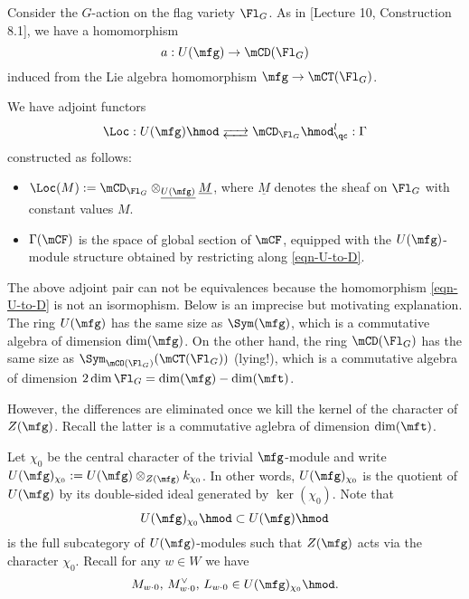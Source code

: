 	Consider the $G$-action on the flag variety $\Fl_G$. As in [Lecture 10, Construction 8.1], we have a homomorphism
	\begin{equation}
		\label{eqn-U-to-D}
		a: U(\mfg) \to \mCD(\Fl_G)
	\end{equation}
	induced from the Lie algebra homomorphism $\mfg \to \mCT(\Fl_G)$.

	\begin{constr}
		We have adjoint functors
		\begin{equation}
			\label{eqn-loc-gamma}
			\Loc: U(\mfg)\hmod \adj \mCD_{\Fl_G}\hmod_\qc^l : \Gamma
		\end{equation}
		constructed as follows:
		\begin{itemize}
			\item 
				$\Loc(M):=  \mCD_{\Fl_G}\ot_{\underline{U(\mfg)}} \underline{M}$, where $\underline{M}$ denotes the sheaf on $\Fl_G$ with constant values $M$.
			\item
				$\Gamma(\mCF)$ is the space of global section of $\mCF$, equipped with the $U(\mfg)$-module structure obtained by restricting along \eqref{eqn-U-to-D}.
		\end{itemize}
	\end{constr}

	\begin{rem}
		The above adjoint pair can not be equivalences because the homomorphism \eqref{eqn-U-to-D} is not an isormophism. Below is an imprecise but motivating explanation. The ring $U(\mfg)$ has the same size as $\Sym(\mfg)$, which is a commutative algebra of dimension $\dim(\mfg)$. On the other hand, the ring $\mCD(\Fl_G)$ has the same size as $\Sym_{\mCO(\Fl_G)}(\mCT(\Fl_G))$ (lying!), which is a commutative algebra of dimension $2\dim \Fl_G = \dim(\mfg)-\dim(\mft)$.
	\end{rem}

	However, the differences are eliminated once we kill the kernel of the character of $Z(\mfg)$. Recall the latter is a commutative aglebra of dimension $\dim(\mft)$.

	\begin{constr}
		Let $\chi_0$ be the central character of the trivial $\mfg$-module and write $U(\mfg)_{\chi_0}:= U(\mfg) \ot_{Z(\mfg)} k_{\chi_0}$. In other words, $U(\mfg)_{\chi_0}$ is the quotient of $U(\mfg)$ by its double-sided ideal generated by $\ker(\chi_0)$. Note that 
		\[
			U(\mfg)_{\chi_0}\hmod  \subset U(\mfg)\hmod
		\]
		is the full subcategory of $U(\mfg)$-modules such that $Z(\mfg)$ acts via the character $\chi_0$. Recall for any $w\in W$ we have
		\[
			M_{w\cdot 0}, \,M_{w\cdot 0}^\vee, \,L_{w\cdot 0} \in U(\mfg)_{\chi_0}\hmod.
		\]
	\end{constr}


